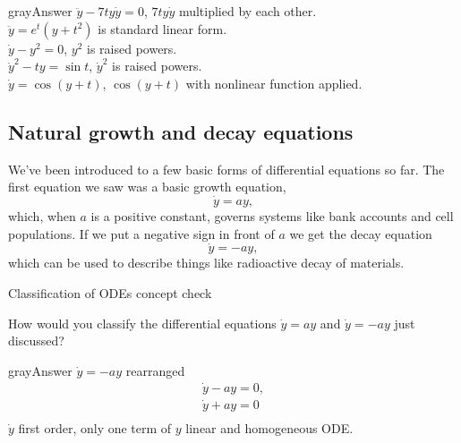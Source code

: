 \begin{mybox}{gray}{Answer}
  $\ddot{y} -7ty \dot{y} = 0$, $7ty \dot{y}$ multiplied by each other.\\
  $\ddot{y} = e^t (y+t^2)$ is standard linear form. \\
  $\dot{y} - y^2 = 0$, $y^2$ is raised powers.\\
  $\dot{y}^2 - t y = \sin t$, $\dot{y}^2$ is raised powers. \\
  $\dot{y} = \cos (y+t)$, $\cos (y+t)$ with nonlinear function applied.   
\end{mybox}
\clearpage

\subsection{Natural growth and decay equations}
We've been introduced to a few basic forms of differential equations so far.
The first equation we saw was a basic growth equation,
\begin{equation*}
  \dot{y} = ay, 
\end{equation*}
which, when $a$ is a positive constant, governs systems like bank accounts and cell populations.
If we put a negative sign in front of $a$ we get the decay equation
\begin{equation*}
  \dot{y} = -ay, 
\end{equation*}
which can be used to describe things like radioactive decay of materials.
\begin{exercise}
  Classification of ODEs concept check
\end{exercise}
How would you classify the differential equations $\dot{y} = ay$ and
$\dot{y} = - ay$ just discussed?
\begin{mybox}{gray}{Answer}
  $\dot{y} = - ay$ rearranged
  \begin{align*}
    \dot{y} - ay = 0, \\
    \dot{y} + ay = 0\\
  \end{align*}
  $\dot{y}$ first order, only one term of $y$ linear and homogeneous ODE.   
\end{mybox}
\clearpage

